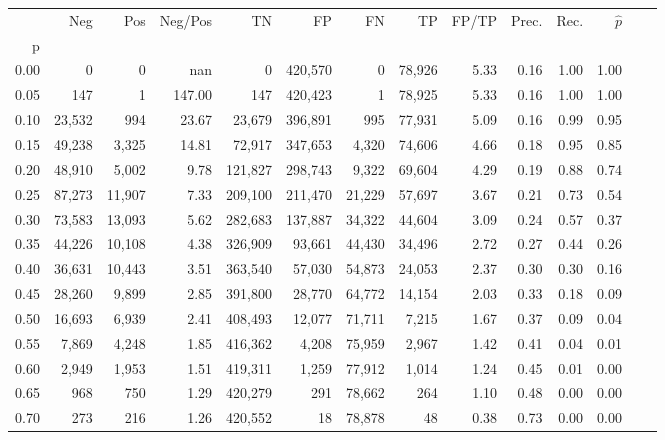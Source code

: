 \begin{tabular}{rrrrrrrrrrrrrr}
\toprule
{} &     Neg &     Pos & Neg/Pos &       TN &       FP &      FN &      TP & FP/TP & Prec. &  Rec. & $\hat{p}$ \\
p    &         &         &         &          &          &         &         &       &       &       &           \\
\midrule
0.00 &       0 &       0 &     nan &        0 &  420,570 &       0 &  78,926 &  5.33 &  0.16 &  1.00 &      1.00 \\
0.05 &     147 &       1 &  147.00 &      147 &  420,423 &       1 &  78,925 &  5.33 &  0.16 &  1.00 &      1.00 \\
0.10 &  23,532 &     994 &   23.67 &   23,679 &  396,891 &     995 &  77,931 &  5.09 &  0.16 &  0.99 &      0.95 \\
0.15 &  49,238 &   3,325 &   14.81 &   72,917 &  347,653 &   4,320 &  74,606 &  4.66 &  0.18 &  0.95 &      0.85 \\
0.20 &  48,910 &   5,002 &    9.78 &  121,827 &  298,743 &   9,322 &  69,604 &  4.29 &  0.19 &  0.88 &      0.74 \\
0.25 &  87,273 &  11,907 &    7.33 &  209,100 &  211,470 &  21,229 &  57,697 &  3.67 &  0.21 &  0.73 &      0.54 \\
0.30 &  73,583 &  13,093 &    5.62 &  282,683 &  137,887 &  34,322 &  44,604 &  3.09 &  0.24 &  0.57 &      0.37 \\
0.35 &  44,226 &  10,108 &    4.38 &  326,909 &   93,661 &  44,430 &  34,496 &  2.72 &  0.27 &  0.44 &      0.26 \\
0.40 &  36,631 &  10,443 &    3.51 &  363,540 &   57,030 &  54,873 &  24,053 &  2.37 &  0.30 &  0.30 &      0.16 \\
0.45 &  28,260 &   9,899 &    2.85 &  391,800 &   28,770 &  64,772 &  14,154 &  2.03 &  0.33 &  0.18 &      0.09 \\
0.50 &  16,693 &   6,939 &    2.41 &  408,493 &   12,077 &  71,711 &   7,215 &  1.67 &  0.37 &  0.09 &      0.04 \\
0.55 &   7,869 &   4,248 &    1.85 &  416,362 &    4,208 &  75,959 &   2,967 &  1.42 &  0.41 &  0.04 &      0.01 \\
0.60 &   2,949 &   1,953 &    1.51 &  419,311 &    1,259 &  77,912 &   1,014 &  1.24 &  0.45 &  0.01 &      0.00 \\
0.65 &     968 &     750 &    1.29 &  420,279 &      291 &  78,662 &     264 &  1.10 &  0.48 &  0.00 &      0.00 \\
0.70 &     273 &     216 &    1.26 &  420,552 &       18 &  78,878 &      48 &  0.38 &  0.73 &  0.00 &      0.00 \\

\end{tabular}
